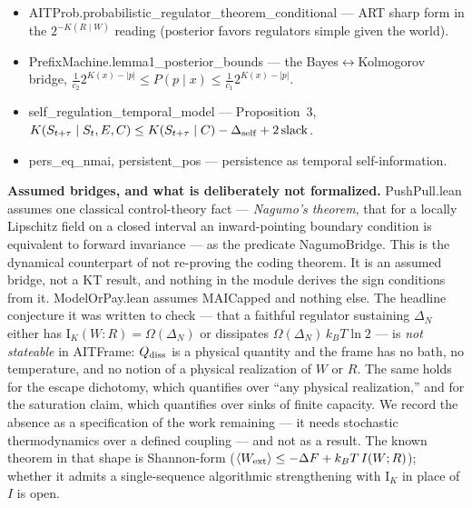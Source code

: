 \documentclass[11pt,a4paper]{article}
\newcommand{\lean}[1]{{\ttfamily\small
  \let\leanunderscore\_\def\_{\leanunderscore\allowbreak}#1}}
\newcommand{\Ik}{\mathrm{I}_K}
\begin{document}
\begin{itemize}[leftmargin=1.4em,itemsep=1pt]
varies, and no reduction from the unrestricted structure function into the induced subclass was
ever given. The declaration is retained only because \lean{corollaryB} documents the regulatory
case, where WP0193 fixes the target and the reduction does go through. Cite
\lean{identification\_barrier} for WP0007.
\item \lean{AITProb.probabilistic\_regulator\_theorem\_conditional} --- ART sharp form in the
$2^{-K(R\mid W)}$ reading (posterior favors regulators simple given the world).
\item \lean{PrefixMachine.lemma1\_posterior\_bounds} --- the Bayes$\leftrightarrow$Kolmogorov bridge,
$\tfrac{1}{c_2}2^{K(x)-|p|}\le P(p\mid x)\le \tfrac{1}{c_1}2^{K(x)-|p|}$.
\item \lean{self\_regulation\_temporal\_model} --- Proposition~3,
$K(S_{t+\tau}\mid S_t,E,C)\le K(S_{t+\tau}\mid C)-\Delta_{\rm self}+2\,\mathrm{slack}$.
\item \lean{pers\_eq\_nmai}, \lean{persistent\_pos} --- persistence as temporal self-information.
\end{itemize}

\noindent\textbf{Assumed bridges, and what is deliberately not formalized.}
\lean{PushPull.lean} assumes one classical control-theory fact --- \emph{Nagumo's theorem}, that for
a locally Lipschitz field on a closed interval an inward-pointing boundary condition is equivalent
to forward invariance --- as the predicate \lean{NagumoBridge}. This is the dynamical counterpart of
not re-proving the coding theorem. It is an assumed bridge, not a KT result, and nothing in the
module derives the sign conditions from it. \lean{ModelOrPay.lean} assumes \lean{MAICapped} and
nothing else. The headline conjecture it was written to check --- that a faithful regulator
sustaining $\Delta_N$ either has
$\Ik(W{:}R)=\Omega(\Delta_N)$ or dissipates $\Omega(\Delta_N)\,k_BT\ln 2$ --- is \emph{not
stateable} in \lean{AITFrame}: $Q_{\rm diss}$ is a physical quantity and the frame has no bath, no
temperature, and no notion of a physical realization of $W$ or $R$. The same holds for the escape
dichotomy, which quantifies over ``any physical realization,'' and for the saturation claim, which
quantifies over sinks of finite capacity. We record the absence as a specification of the work
remaining --- it needs stochastic thermodynamics over a defined coupling --- and not as a result.
The known theorem in that shape is Shannon-form
($\langle W_{\rm ext}\rangle\le-\Delta F+k_BT\,I(W;R)$); whether it admits a single-sequence
algorithmic strengthening with $\Ik$ in place of $I$ is open.
\end{document}

